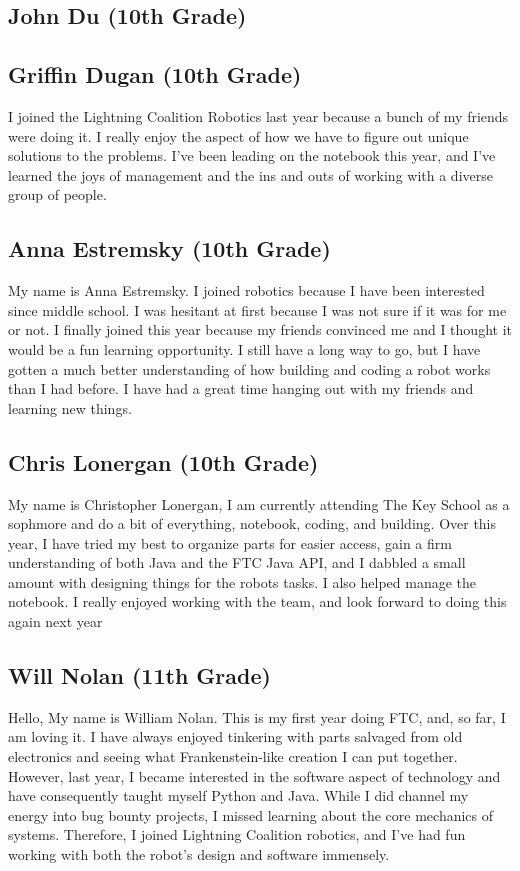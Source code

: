 \documentclass[12pt]{article}
\begin{document}
\subsection{John Du (10th Grade)}

\subsection{Griffin Dugan (10th Grade)}
I joined the Lightning Coalition Robotics last year because a bunch of my friends were doing it. I really enjoy the aspect of how we have to figure out unique solutions to the problems. I've been leading on the notebook this year, and I've learned the joys of management and the ins and outs of working with a diverse group of people.

\subsection{Anna Estremsky (10th Grade)}
My name is Anna Estremsky. I joined robotics because I have been interested since middle school. I was hesitant at first because I was not sure if it was for me or not. I finally joined this year because my friends convinced me and I thought it would be a fun learning opportunity. I still have a long way to go, but I have gotten a much better understanding of how building and coding a robot works than I had before. I have had a great time hanging out with my friends and learning new things. 

\subsection{Chris Lonergan (10th Grade)}
My name is Christopher Lonergan, I am currently attending The Key School as a sophmore and do a bit of everything, notebook, coding, and building. Over this year, I have tried my best to organize parts for easier access, gain a firm understanding of both Java and the FTC Java API, and I dabbled a small amount with designing things for the robots tasks. I also helped manage the notebook. I really enjoyed working with the team, and look forward to doing this again next year

\subsection{Will Nolan (11th Grade)}
Hello, My name is William Nolan. This is my first year doing FTC, and, so far, I am loving it. I have always enjoyed tinkering with parts salvaged from old electronics and seeing what Frankenstein-like creation I can put together. However, last year, I became interested in the software aspect of technology and have consequently taught myself Python and Java. While I did channel my energy into bug bounty projects, I missed learning about the core mechanics of systems. Therefore, I joined Lightning Coalition robotics, and I’ve had fun working with both the robot’s design and software immensely.
\end{document}
